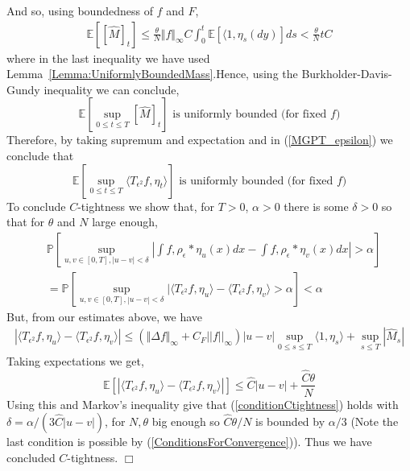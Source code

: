\documentclass[12pt]{article}
\newenvironment {proof}{{\noindent\bf Proof }}{\hfill $\Box$ \medskip}
\newcommand{\IP}{\mathbb P}
\newcommand{\IE}{\mathbb E}
\begin{document}
\begin{proof}
And so, using boundedness of $f$ and $F$,
\begin{align*}
\IE\left[ [\widehat{M}]_t \right] \leq \frac{\theta}{N} \Vert f \Vert_\infty C \int_0^t \mathbb{E}\left[ \langle 1, \eta_s(dy) \right] ds < \frac{\theta}{N} t C
\end{align*}
where in the last inequality we have used Lemma~\ref{Lemma:UniformlyBoundedMass}.Hence, using the Burkholder-Davis-Gundy inequality we can conclude,
\[ \IE[\sup_{0 \leq t \leq T} [\widehat{M}]_t ] \text{ is uniformly bounded (for fixed } f \text{)} \]
Therefore, by taking supremum and expectation and in (\ref{MGPT_epsilon}) we conclude that
\begin{equation} \IE[\sup_{0 \leq t \leq T} \langle T_{\epsilon^2} f, \eta_t \rangle ] \text{ is uniformly bounded (for fixed } f \text{)} \label{eq:boundedIntegralAgainstf} \end{equation}
To conclude $C$-tightness we show that, for $T>0$, $\alpha > 0$ there is some $\delta >0$ so that for $\theta$ and $N$ large enough,
\begin{align}
&\IP\left[ \sup_{u,v \in [0,T], |u-v| < \delta} \left| \int f, \rho_\epsilon*\eta_u(x) dx   - \int f, \rho_\epsilon*\eta_v(x) dx \right|  > \alpha \right]
    \\ &=
\IP\left[ \sup_{u,v \in [0,T], |u-v| < \delta} | \langle T_{\epsilon^2} f, \eta_u \rangle - \langle T_{\epsilon^2} f,\eta_v \rangle > \alpha \right]
    <
    \alpha \label{conditionCtightness}
\end{align}
But, from our estimates above, we have
\begin{align*}
|\langle T_{\epsilon^2} f, \eta_u \rangle - \langle T_{\epsilon^2} f,\eta_v \rangle|  \leq ( \Vert \Delta f \Vert_\infty + C_F||f||_\infty) |u-v| \sup_{0 \leq s \leq T } \langle 1, \eta_s \rangle + \sup_{s \leq T}|\widehat{M}_s|
\end{align*}
Taking expectations we get,
\begin{equation}
\IE\left[ |\langle T_{\epsilon^2} f, \eta_u \rangle - \langle T_{\epsilon^2} f,\eta_v \rangle|\right] \leq \widehat{C} |u-v| + \frac{\widehat{C}\theta}{N}\end{equation}
Using this and Markov's inequality give that (\ref{conditionCtightness}) holds with $\delta = \alpha/(3 \widehat{C}|u-v|)$, for $N,\theta$ big enough so $\widehat{C}\theta/N$ is bounded by $\alpha/3$ (Note the last condition is possible by (\ref{ConditionsForConvergence})). Thus we have concluded $C$-tightness. 
\end{proof}
\end{document}
